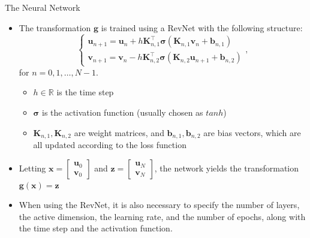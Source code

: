 \documentclass[10pt]{beamer}
\begin{document}
\begin{frame}{The Neural Network}
    \begin{itemize}
        \item The transformation $\bm{g}$ is trained using a RevNet with the following structure:
        $$
        \begin{cases}
            \bm{u}_{n+1} = \bm{u}_n + h\bm{K}_{n,1}^\top\boldsymbol{\sigma}(\bm{K}_{n,1}\bm{v}_n + \bm{b}_{n,1}) \\
            \bm{v}_{n+1} = \bm{v}_n - h\bm{K}_{n,2}^\top \boldsymbol{\sigma}(\bm{K}_{n,2}\bm{u}_{n+1} + \bm{b}_{n,2}) 
        \end{cases},
        $$ for $n = 0, 1, \dots, N-1$.
        
        \begin{itemize}
            \item $h \in \mathbb{R}$ is the time step
        
            \item $\boldsymbol{\sigma}$ is the activation function (usually chosen as $tanh$)
        
            \item $\bm{K}_{n,1}, \bm{K}_{n,2}$ are weight matrices, and $\bm{b}_{n,1}, \bm{b}_{n,2}$ are bias vectors, which are all updated according to the loss function
        \end{itemize}
        
        \item Letting $\bm{x} =
                    \begin{bmatrix}
                    \bm{u}_0 \\
                    \bm{v}_0
                    \end{bmatrix}$ and
                    $\bm{z} = 
                    \begin{bmatrix}
                    \bm{u}_N \\
                    \bm{v}_N
                    \end{bmatrix}$,
        the network yields the transformation $\bm{g}(\bm{x}) = \bm{z}$
    \item When using the RevNet, it is also necessary to specify the number of layers, the active dimension, the learning rate, and the number of epochs, along with the time step and the activation function.  
    \end{itemize}   
\end{frame}
\end{document}
